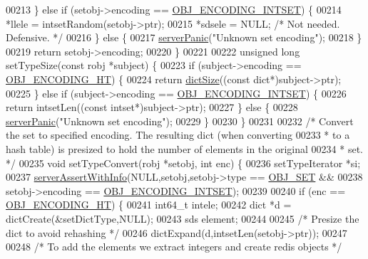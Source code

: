 \begin{DoxyCode}
00213     \} \textcolor{keywordflow}{else} \textcolor{keywordflow}{if} (setobj->encoding == \hyperlink{server_8h_a214173987de21c3b7661fddd42b05873}{OBJ\_ENCODING\_INTSET}) \{
00214         *llele = intsetRandom(setobj->ptr);
00215         *sdsele = NULL; \textcolor{comment}{/* Not needed. Defensive. */}
00216     \} \textcolor{keywordflow}{else} \{
00217         \hyperlink{server_8h_a11cc378e7778a830b41240578de3b204}{serverPanic}(\textcolor{stringliteral}{"Unknown set encoding"});
00218     \}
00219     \textcolor{keywordflow}{return} setobj->encoding;
00220 \}
00221 
00222 \textcolor{keywordtype}{unsigned} \textcolor{keywordtype}{long} setTypeSize(\textcolor{keyword}{const} robj *subject) \{
00223     \textcolor{keywordflow}{if} (subject->encoding == \hyperlink{server_8h_a9c10219f68afc557d510d108257d238b}{OBJ\_ENCODING\_HT}) \{
00224         \textcolor{keywordflow}{return} \hyperlink{dict_8h_af193430dd3d5579a52b194512f72c1f0}{dictSize}((\textcolor{keyword}{const} dict*)subject->ptr);
00225     \} \textcolor{keywordflow}{else} \textcolor{keywordflow}{if} (subject->encoding == \hyperlink{server_8h_a214173987de21c3b7661fddd42b05873}{OBJ\_ENCODING\_INTSET}) \{
00226         \textcolor{keywordflow}{return} intsetLen((\textcolor{keyword}{const} intset*)subject->ptr);
00227     \} \textcolor{keywordflow}{else} \{
00228         \hyperlink{server_8h_a11cc378e7778a830b41240578de3b204}{serverPanic}(\textcolor{stringliteral}{"Unknown set encoding"});
00229     \}
00230 \}
00231 
00232 \textcolor{comment}{/* Convert the set to specified encoding. The resulting dict (when converting}
00233 \textcolor{comment}{ * to a hash table) is presized to hold the number of elements in the original}
00234 \textcolor{comment}{ * set. */}
00235 \textcolor{keywordtype}{void} setTypeConvert(robj *setobj, \textcolor{keywordtype}{int} enc) \{
00236     setTypeIterator *si;
00237     \hyperlink{server_8h_a7308f76cbff9a8d3797fe78190b91282}{serverAssertWithInfo}(NULL,setobj,setobj->type == 
      \hyperlink{server_8h_a8d179375a4aac33d3fa7aa80c8ccc75f}{OBJ\_SET} &&
00238                              setobj->encoding == \hyperlink{server_8h_a214173987de21c3b7661fddd42b05873}{OBJ\_ENCODING\_INTSET});
00239 
00240     \textcolor{keywordflow}{if} (enc == \hyperlink{server_8h_a9c10219f68afc557d510d108257d238b}{OBJ\_ENCODING\_HT}) \{
00241         int64\_t intele;
00242         dict *d = dictCreate(&setDictType,NULL);
00243         sds element;
00244 
00245         \textcolor{comment}{/* Presize the dict to avoid rehashing */}
00246         dictExpand(d,intsetLen(setobj->ptr));
00247 
00248         \textcolor{comment}{/* To add the elements we extract integers and create redis objects */}

\end{DoxyCode}
